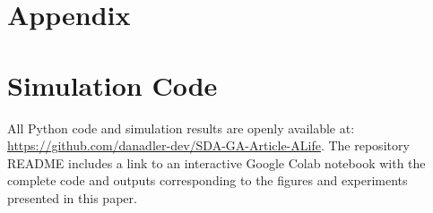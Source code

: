 \documentclass{artificial-life}
\begin{document}





% 


\printbibliography

\section*{Appendix}
\appendix

\section{Simulation Code}

All Python code and simulation results are openly available at:
\url{https://github.com/danadler-dev/SDA-GA-Article-ALife}. 
The repository README includes a link to an interactive Google Colab notebook with the complete code and outputs corresponding to the figures and experiments presented in this paper.
\end{document}
